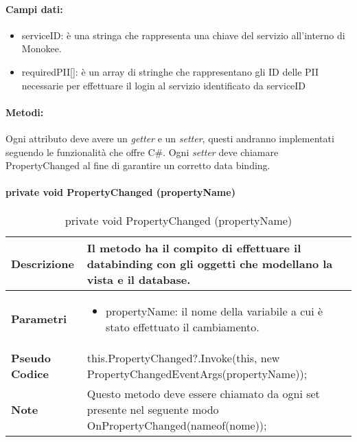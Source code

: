 \paragraph{Campi dati:}
\begin{itemize}
    \item serviceID: è una stringa che rappresenta una chiave del servizio all’interno di Monokee.
    \item requiredPII[]: è un array di stringhe che rappresentano gli ID delle PII necessarie per effettuare il login al servizio identificato da serviceID
\end{itemize}

\paragraph{Metodi:}
Ogni attributo deve avere un \emph{getter} e un \emph{setter}, questi andranno implementati seguendo le funzionalità che offre C\#. Ogni \emph{setter} deve chiamare PropertyChanged al fine di garantire un corretto data binding.

\paragraph{private void PropertyChanged (propertyName)}
\begin{center}
    \begin{longtable}{|p{3cm}|p{9cm}|}%
    \caption{private void PropertyChanged (propertyName)}
    \endfirsthead
    \endhead
    \hline
    \textbf{Descrizione} & Il metodo ha il compito di effettuare il databinding con gli oggetti che modellano la vista e il database.\\
    \hline
    \textbf{Parametri} &      
    \begin{itemize}
        \item propertyName: il nome della variabile a cui è stato effettuato il cambiamento.
    \end{itemize}
    \\
    \hline
    \textbf{Pseudo Codice} & 
    this.PropertyChanged?.Invoke(this, 
    new PropertyChangedEventArgs(propertyName));
    \\
    \hline
    \textbf{Note} & 
    Questo metodo deve essere chiamato da ogni set presente nel seguente modo OnPropertyChanged(nameof(nome));
    \\
    \hline
    \end{longtable}
    \end{center}

